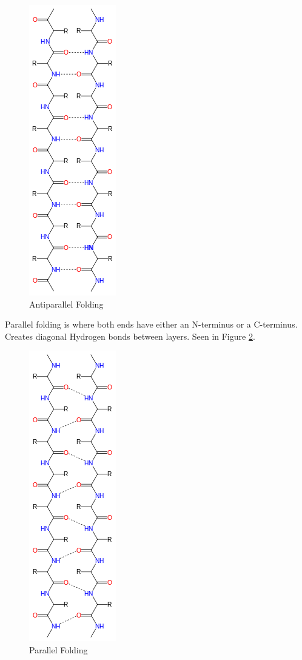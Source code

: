 \documentclass[a4paper,11pt]{article}
\begin{document}
\begin{figure}
\begin{center}
\includegraphics{antiparallel.png}
\caption{Antiparallel Folding}
\label{fig:antiparallel}
\end{center}
\end{figure}

Parallel folding is where both ends have either an N-terminus or a C-terminus.
Creates diagonal Hydrogen bonds between layers. Seen in Figure
\ref{fig:parallel}.

\begin{figure}
\begin{center}
\includegraphics{parallel.png}
\caption{Parallel Folding}
\label{fig:parallel}
\end{center}
\end{figure}
\end{document}
